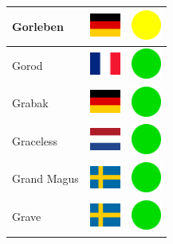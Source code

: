 \documentclass[12pt, a4paper, twoside]{report}
\begin{document}
\begin{center}
\begin{longtable}{|p{5cm}|p{2cm}|p{2cm}|}
 Gorleben                                                   & \includegraphics[width=1cm]{../img/flags/de} &   \includegraphics[width=1cm]{../likes/m} \\ \hline
 Gorod                                                      & \includegraphics[width=1cm]{../img/flags/fr} &   \includegraphics[width=1cm]{../likes/y} \\ \hline
 Grabak                                                     & \includegraphics[width=1cm]{../img/flags/de} &   \includegraphics[width=1cm]{../likes/y} \\ \hline
 Graceless                                                  & \includegraphics[width=1cm]{../img/flags/nl} &   \includegraphics[width=1cm]{../likes/y} \\ \hline
 Grand Magus                                                & \includegraphics[width=1cm]{../img/flags/se} &   \includegraphics[width=1cm]{../likes/y} \\ \hline
 Grave                                                      & \includegraphics[width=1cm]{../img/flags/se} &   \includegraphics[width=1cm]{../likes/y} \\ \hline

\end{longtable}
\end{center}
\end{document}
